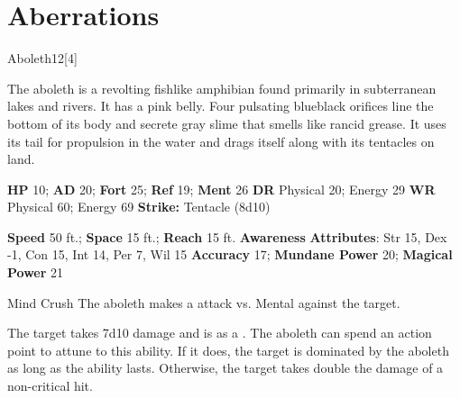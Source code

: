 
        \section{Aberrations}
      
  \begin{monsection}{Aboleth}{12}[4]
    \vspace{-1em}\vspace{-1em}
    \vspace{0em}

    
    The aboleth is a revolting fishlike amphibian found primarily in subterranean lakes and rivers.
    It has a pink belly.
    Four pulsating blueblack orifices line the bottom of its body and secrete gray slime that smells like rancid grease.
    It uses its tail for propulsion in the water and drags itself along with its tentacles on land.
  

    \begin{spellcontent}
      \begin{spelltargetinginfo}
        \pari \textbf{HP} 10;
          \textbf{AD} 20;
          \textbf{Fort} 25;
          \textbf{Ref} 19;
          \textbf{Ment} 26
        \pari \textbf{DR} Physical 20; Energy 29
        \pari \textbf{WR} Physical 60; Energy 69
        \pari \textbf{Strike:}
            Tentacle  (8d10)
      \end{spelltargetinginfo}
    \end{spellcontent}
    \begin{monsterfooter}
      \pari \textbf{Speed} 50 ft.;
        \textbf{Space} 15 ft.;
        \textbf{Reach} 15 ft.
      \pari \textbf{Awareness} 
      \pari \textbf{Attributes}:
        Str 15, Dex -1,
        Con 15, Int 14,
        Per 7, Wil 15
      \pari \textbf{Accuracy} 17;
        \textbf{Mundane Power} 20;
      \textbf{Magical Power} 21
    \end{monsterfooter}
  \end{monsection}
  \begin{freeability}{Mind Crush}
       The aboleth makes a  attack
        vs. Mental against the target.
    
    \hit The target takes 7d10  damage and is  as a .
    \crit 
          The aboleth can spend an action point to attune to this ability.
          If it does, the target is dominated by the aboleth as long as the ability lasts.
          Otherwise, the target takes double the damage of a non-critical hit.
    \end{freeability}
  

